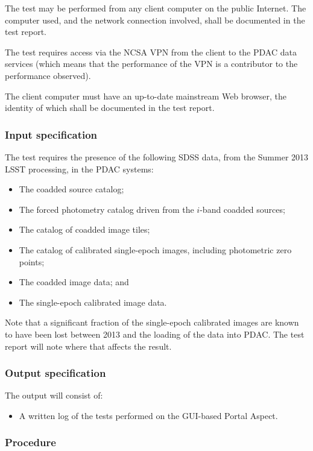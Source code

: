 The test may be performed from any client computer on the public Internet.
The computer used, and the network connection involved, shall be documented in the test report.

The test requires access via the NCSA VPN from the client to the PDAC data services 
(which means that the performance of the VPN is a contributor to the performance observed).

The client computer must have an up-to-date mainstream Web browser, the identity of which shall be documented in the test report.


\subsubsection{Input specification}

The test requires the presence of the following SDSS data, from the Summer 2013 LSST processing, in the PDAC systems:

\begin{itemize}

  \item{The coadded source catalog;}
  \item{The forced photometry catalog driven from the $i$-band coadded sources;}
  \item{The catalog of coadded image tiles;}
  \item{The catalog of calibrated single-epoch images, including photometric zero points;}
  \item{The coadded image data; and}
  \item{The single-epoch calibrated image data.}
\end{itemize}

Note that a significant fraction of the single-epoch calibrated images are known to have been lost between 2013 and the loading of the data into PDAC.
The test report will note where that affects the result.

\subsubsection{Output specification}

The output will consist of:

\begin{itemize}
  \item{A written log of the tests performed on the GUI-based Portal Aspect.}
\end{itemize}


\subsubsection{Procedure}

